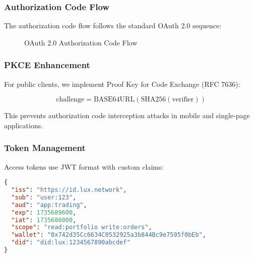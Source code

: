 \documentclass[11pt,a4paper]{article}
\begin{document}
\subsubsection{Authorization Code Flow}

The authorization code flow follows the standard OAuth 2.0 sequence:

\begin{figure}[h]
\centering
{}
\caption{OAuth 2.0 Authorization Code Flow}
\end{figure}

\subsubsection{PKCE Enhancement}

For public clients, we implement Proof Key for Code Exchange (RFC 7636):

\begin{equation}
    \text{challenge} = \text{BASE64URL}(\text{SHA256}(\text{verifier}))
\end{equation}

This prevents authorization code interception attacks in mobile and single-page applications.

\subsubsection{Token Management}

Access tokens use JWT format with custom claims:

\begin{lstlisting}[language=json]
{
  "iss": "https://id.lux.network",
  "sub": "user:123",
  "aud": "app:trading",
  "exp": 1735689600,
  "iat": 1735686000,
  "scope": "read:portfolio write:orders",
  "wallet": "0x742d35Cc6634C0532925a3b844Bc9e7595f0bEb",
  "did": "did:lux:1234567890abcdef"
}
\end{lstlisting}
\end{document}
